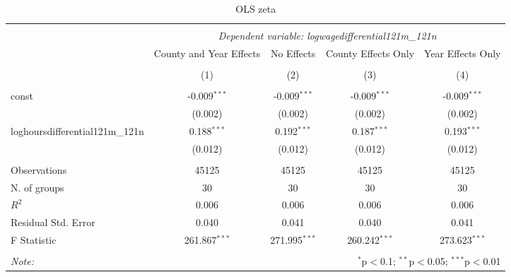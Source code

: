 \documentclass{report}
\begin{document}
\begin{table}[!htbp] \centering
  \caption{OLS zeta }
\begin{tabular}{@{\extracolsep{5pt}}lcccc}
\\[-1.8ex]\hline
\hline \\[-1.8ex]
& \multicolumn{4}{c}{\textit{Dependent variable: logwagedifferential121m_121n}} \
\cr \cline{2-5}
\\[-1.8ex] & \multicolumn{1}{c}{County and Year Effects} & \multicolumn{1}{c}{No Effects} & \multicolumn{1}{c}{County Effects Only} & \multicolumn{1}{c}{Year Effects Only}  \\
\\[-1.8ex] & (1) & (2) & (3) & (4) \\
\hline \\[-1.8ex]
 const & -0.009$^{***}$ & -0.009$^{***}$ & -0.009$^{***}$ & -0.009$^{***}$ \\
& (0.002) & (0.002) & (0.002) & (0.002) \\
 loghoursdifferential121m_121n & 0.188$^{***}$ & 0.192$^{***}$ & 0.187$^{***}$ & 0.193$^{***}$ \\
& (0.012) & (0.012) & (0.012) & (0.012) \\
\hline \\[-1.8ex]
 Observations & 45125 & 45125 & 45125 & 45125 \\
 N. of groups & 30 & 30 & 30 & 30 \\
 $R^2$ & 0.006 & 0.006 & 0.006 & 0.006 \\
 Residual Std. Error & 0.040 & 0.041 & 0.040 & 0.041 \\
 F Statistic & 261.867$^{***}$ & 271.995$^{***}$ & 260.242$^{***}$ & 273.623$^{***}$ \\
\hline
\hline \\[-1.8ex]
\textit{Note:} & \multicolumn{4}{r}{$^{*}$p$<$0.1; $^{**}$p$<$0.05; $^{***}$p$<$0.01} \\
\end{tabular}
\end{table}
\end{document}
